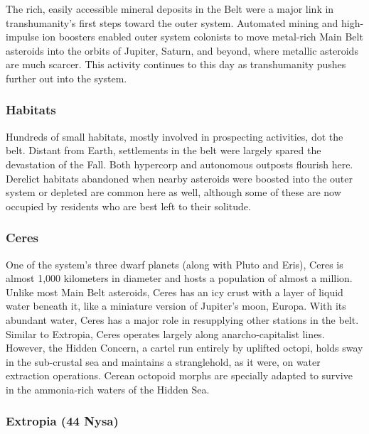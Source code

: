 The rich, easily accessible mineral deposits in the 
Belt were a major link in transhumanity's first steps 
toward the outer system. Automated mining and 
high-impulse ion boosters enabled outer system 
colonists to move metal-rich Main Belt asteroids 
into the orbits of Jupiter, Saturn, and beyond, where 
metallic asteroids are much scarcer. This activity 
continues to this day as transhumanity pushes further out into the system.

\subsubsection{Habitats}

Hundreds of small habitats, mostly involved in prospecting activities, dot the belt. Distant from Earth, 
settlements in the belt were largely spared the devastation of the Fall. Both hypercorp and autonomous 
outposts flourish here. Derelict habitats abandoned 
when nearby asteroids were boosted into the outer 
system or depleted are common here as well, although 
some of these are now occupied by residents who are 
best left to their solitude.

\subsubsection{Ceres}

One of the system's three dwarf planets (along with 
Pluto and Eris), Ceres is almost 1,000 kilometers in 
diameter and hosts a population of almost a million. 
Unlike most Main Belt asteroids, Ceres has an icy 
crust with a layer of liquid water beneath it, like a 
miniature version of Jupiter's moon, Europa. With 
its abundant water, Ceres has a major role in resupplying other stations in the belt. Similar to Extropia, 
Ceres operates largely along anarcho-capitalist lines. 
However, the Hidden Concern, a cartel run entirely 
by uplifted octopi, holds sway in the sub-crustal sea 
and maintains a stranglehold, as it were, on water 
extraction operations. Cerean octopoid morphs are 
specially adapted to survive in the ammonia-rich 
waters of the Hidden Sea.

\subsubsection{Extropia (44 Nysa)}

